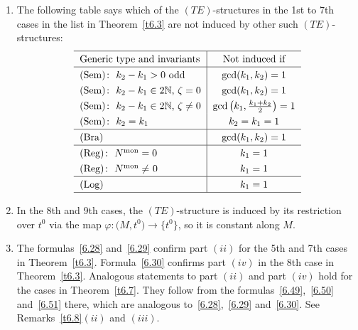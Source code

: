 \documentclass[10pt,a4paper]{amsart}
\numberwithin{equation}{section}
\numberwithin{figure}{section}
\newcommand{\N}{{\mathbb N}}
\begin{document}
\begin{Remarks}
\begin{enumerate}
\item[$(iii)$] The following table says
which of the $(TE)$-structures in the 1st to 7th cases
in the list in Theorem~\ref{t6.3}
are not induced by other such $(TE)$-structures:
\[
\def\arraystretch{1.3}
\begin{tabular}{l|c}
\hline
Generic type and invariants & Not induced if
\\ \hline
(Sem)$\colon\ k_2-k_1>0$ odd & $\gcd(k_1,k_2)=1$
\\
(Sem)$\colon\ k_2-k_1\in 2\N$, $\zeta= 0$ & $\gcd(k_1,k_2)=1$
\\
(Sem)$\colon\ k_2-k_1\in 2\N$, $\zeta\neq 0$ &
$\gcd\big(k_1,\frac{k_1+k_2}{2}\big)=1$
\\
(Sem)$\colon\ k_2=k_1$ &$ k_2=k_1=1 $
\\ \hline
(Bra) & $\gcd(k_1,k_2)=1$
\\ \hline
(Reg)$\colon\ N^{\rm mon}=0$ &$ k_1=1$
\\
(Reg)$\colon\ N^{\rm mon}\neq$ 0 & $k_1=1$
\\ \hline
(Log) & $k_1=1$
\\
\hline
\end{tabular}
\]

\item[$(iv)$] In the 8th and 9th cases, the $(TE)$-structure is
induced by its restriction over $t^0$ via the map
$\varphi\colon \big(M,t^0\big)\to\big\{t^0\big\}$, so it is constant
along $M$.

\item[$(v)$] The formulas~\eqref{6.28} and~\eqref{6.29}
confirm part $(ii)$ for the 5th and 7th cases in Theorem~\ref{t6.3}.
Formula~\eqref{6.30} confirms part $(iv)$ in the
8th case in Theorem~\ref{t6.3}.
Analogous statements to part $(ii)$ and part $(iv)$
hold for the cases in Theorem~\ref{t6.7}.
They follow from the formulas~\eqref{6.49},~\eqref{6.50}
and~\eqref{6.51} there,
which are analogous to~\eqref{6.28},~\eqref{6.29}
and~\eqref{6.30}.
See Remarks~\ref{t6.8}$(ii)$ and $(iii)$.
\end{enumerate}
\end{Remarks}
\end{document}
